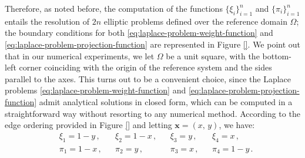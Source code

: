 \documentclass[12pt, a4paper, twoside, openright]{report}
\numberwithin{equation}{chapter}
\theoremstyle{theorem}
\theoremstyle{definition}
\theoremstyle{remark}
\theoremstyle{proposition}
\numberwithin{figure}{chapter}
\newcommand{\bg}[1]{\boldsymbol{#1}}
\begin{document}
		Therefore, as noted before, the computation of the functions $\big\lbrace \xi_i \big\rbrace_{i = 1}^n$ and $\big\lbrace \pi_i \big\rbrace_{i = 1}^n$ entails the resolution of $2n$ elliptic problems defined over the reference domain $\Omega$; the boundary conditions for both \eqref{eq:laplace-problem-weight-function} and \eqref{eq:laplace-problem-projection-function} are represented in Figure \ref{}. We point out that in our numerical experiments, we let $\Omega$ be a unit square, with the bottom-left corner coinciding with the origin of the reference system and the sides parallel to the axes. This turns out to be a convenient choice, since the Laplace problems \eqref{eq:laplace-problem-weight-function} and \eqref{eq:laplace-problem-projection-function} admit analytical solutions in closed form, which can be computed in a straightforward way without resorting to any numerical method. According to the edge ordering provided in Figure \ref{} and letting $\bg{x} = (x, \, y)$, we have:
		\begin{equation}
			\label{eq:weight-projection-function}
			\begin{aligned}
				& \xi_1 = 1 - y \, , && \xi_2 = 1 - x \, , && \xi_3 = y \, , && \xi_4 = x \, , \\
				& \pi_1 = 1 - x \, , && \pi_2 = y \, , && \pi_3 = x \, , && \pi_4 = 1 - y \, .
			\end{aligned}
		\end{equation}
		
\end{document}

